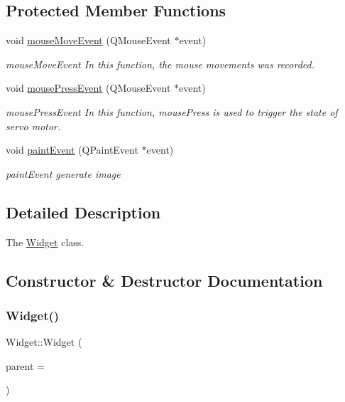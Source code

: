 \subsection*{Protected Member Functions}
\begin{DoxyCompactItemize}
\item 
void \mbox{\hyperlink{class_widget_ae67612ab62d0a43c6ebd3759b883cdd2}{mouse\+Move\+Event}} (Q\+Mouse\+Event $\ast$event)
\begin{DoxyCompactList}\small\item\em mouse\+Move\+Event In this function, the mouse movements was recorded. \end{DoxyCompactList}\item 
void \mbox{\hyperlink{class_widget_a681594b94d8b48c7e7b669268f3baf81}{mouse\+Press\+Event}} (Q\+Mouse\+Event $\ast$event)
\begin{DoxyCompactList}\small\item\em mouse\+Press\+Event In this function, mouse\+Press is used to trigger the state of servo motor. \end{DoxyCompactList}\item 
void \mbox{\hyperlink{class_widget_af755e8891f462562c88c37735345a798}{paint\+Event}} (Q\+Paint\+Event $\ast$event)
\begin{DoxyCompactList}\small\item\em paint\+Event generate image \end{DoxyCompactList}\end{DoxyCompactItemize}


\subsection{Detailed Description}
The \mbox{\hyperlink{class_widget}{Widget}} class. 

\subsection{Constructor \& Destructor Documentation}
\mbox{\label{class_widget_a29531c7f141e461322981b3b579d4590}} 
\subsubsection{\texorpdfstring{Widget()}{Widget()}}
{\footnotesize\ttfamily Widget\+::\+Widget (\begin{DoxyParamCaption}\item[{Q\+Widget $\ast$}]{parent = {} }\end{DoxyParamCaption})\hspace{0.3cm}{\ttfamily [explicit]}}



